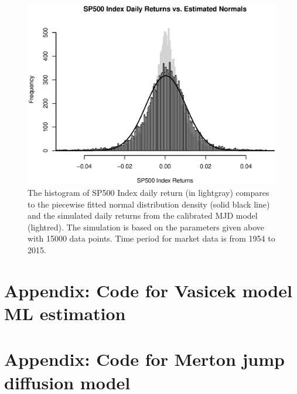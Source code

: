 \documentclass[11pt,reqno,final]{amsart}
\begin{document}
\begin{figure}
  \centering
  \includegraphics[scale=0.7]{spx_plot_returns.eps}
  \caption{The histogram of SP500 Index daily return (in lightgray) compares to the piecewise fitted normal distribution density (solid black line) and the simulated daily returns from the calibrated MJD model (lightred). The simulation is based on the parameters given above with 15000 data points. Time period for market data is from 1954 to 2015.}\label{plot_hist}
\end{figure}


%
%


%
%
\newpage
\section*{Appendix: Code for Vasicek model ML estimation}


\newpage
\section*{Appendix: Code for Merton jump diffusion model }

\end{document}
